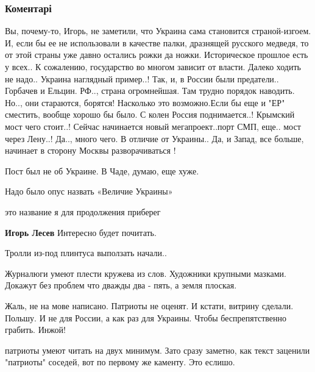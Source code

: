  
 
 
 
 
\subsubsection{Коментарі}

\begin{itemize} %

Вы, почему-то, Игорь, не заметили, что Украина сама становится страной-изгоем.
И, если бы ее не использовали в качестве палки, дразнящей русского медведя, то
от этой страны уже давно остались рожки да ножки. Историческое прошлое есть у
всех.. К сожалению, государство во многом зависит от власти. Далеко ходить не
надо.. Украина наглядный пример..! Так, и, в России были предатели.. Горбачев и
Ельцин. РФ.., страна огромнейшая. Там трудно порядок наводить. Но.., они
стараются, борятся! Насколько это возможно.Если бы еще и "ЕР" сместить, вообще
хорошо бы было. С колен Россия поднимается..! Крымский мост чего стоит..!
Сейчас начинается новый мегапроект..порт СМП, еще.. мост через Лену..! Да..,
много чего. В отличие от Украины.. Да, и Запад, все больше, начинает в сторону
Москвы разворачиваться !


Пост был не об Украине. В Чаде, думаю, еще хуже.

Надо было опус назвать «Величие Украины»

это название я для продолжения приберег

\textbf{Игорь Лесев} Интересно будет почитать.

Тролли из-под плинтуса выползать начали..

Журналюги умеют плести кружева из слов. Художники крупными мазками. Докажут без проблем что дважды два - пять, а земля плоская.


Жаль, не на мове написано. Патриоты не оценят. И кстати, витрину сделали.
Польшу. И не для России, а как раз для Украины. Чтобы беспрепятственно грабить.
Инжой!

\begin{itemize} %
патриоты умеют читать на двух минимум.
Зато сразу заметно, как текст заценили "патриоты" соседей, вот по первому же каменту.
Это еслишо.


\end{itemize}
\end{itemize}
